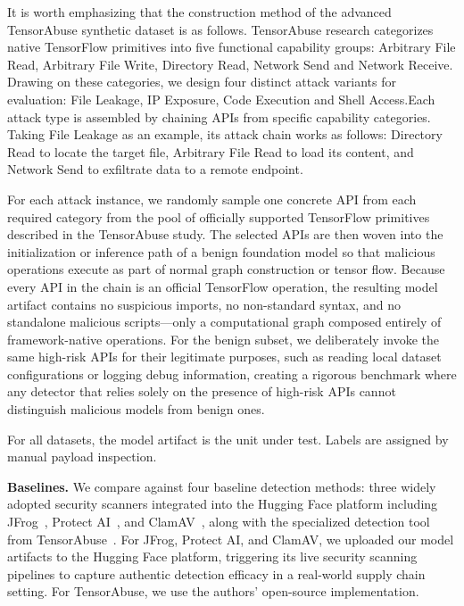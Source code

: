 It is worth emphasizing that the construction method of the advanced TensorAbuse synthetic dataset is as follows. TensorAbuse research categorizes native TensorFlow primitives into five functional capability groups: Arbitrary File Read, Arbitrary File Write, Directory Read, Network Send and Network Receive. Drawing on these categories, we design four distinct attack variants for evaluation: File Leakage, IP Exposure, Code Execution and Shell Access.Each attack type is assembled by chaining APIs from specific capability categories. 
Taking File Leakage as an example, its attack chain works as follows:  Directory Read to locate the target file, Arbitrary File Read to load its content, and Network Send to exfiltrate data to a remote endpoint. 

For each attack instance, we randomly sample one concrete API from each required category from the pool of officially supported TensorFlow primitives described in the TensorAbuse study. The selected APIs are then woven into the initialization or inference path of a benign foundation model so that malicious operations execute as part of normal graph construction or tensor flow. Because every API in the chain is an official TensorFlow operation, the resulting model artifact contains no suspicious imports, no non-standard syntax, and no standalone malicious scripts—only a computational graph composed entirely of framework-native operations. For the benign subset, we deliberately invoke the same high-risk APIs for their legitimate purposes, such as reading local dataset configurations or logging debug information, creating a rigorous benchmark where any detector that relies solely on the presence of high-risk APIs cannot distinguish malicious models from benign ones.

For all datasets, the model artifact is the unit under test. Labels are assigned by manual payload inspection.

\noindent \textbf{Baselines.}
We compare against four baseline detection methods: three widely adopted security scanners integrated into the Hugging Face platform including JFrog~\cite{jfrog2024huggingface}, Protect AI~\cite{modelscan}, and ClamAV~\cite{clamav}, along with the specialized detection tool from TensorAbuse~\cite{zhu2025}.
For JFrog, Protect AI, and ClamAV, we uploaded our model artifacts to the Hugging Face platform, triggering its live security scanning pipelines to capture authentic detection efficacy in a real-world supply chain setting. For TensorAbuse, we use the authors' open-source implementation. 

